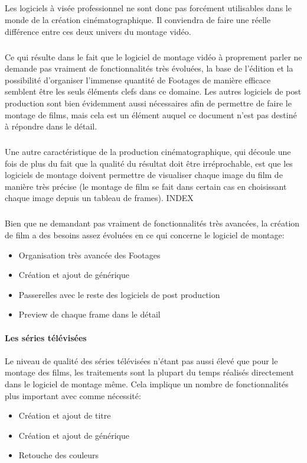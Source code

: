 \subparagraph{}
Les logiciels à visée professionnel ne sont donc pas forcément utilisables dans
le monde de la création cinématographique. Il conviendra de faire une réelle
différence entre ces deux univers du montage vidéo.

\subparagraph{}
Ce qui résulte dans le fait que le logiciel de montage vidéo à proprement parler ne
demande pas vraiment de fonctionnalités très évoluées, la base de l'édition
et la possibilité d'organiser l'immense quantité de Footages de manière efficace
semblent être les seuls éléments clefs dans ce domaine. Les autres logiciels de
post production sont bien évidemment aussi nécessaires afin de permettre de faire
le montage de films, mais cela est un élément auquel ce document n'est pas destiné
à répondre dans le détail.

\subparagraph{}
Une autre caractéristique de la production cinématographique, qui découle une
fois de plus du fait que la qualité du résultat doit être irréprochable, est
que les logiciels de montage doivent permettre de visualiser chaque image du
film de manière très précise (le montage de film se fait dans certain cas en
choisissant chaque image depuis un tableau de frames). INDEX


\subparagraph{}
Bien que ne demandant pas vraiment de fonctionnalités très avancées, la création
de film a des besoins assez évoluées en ce qui concerne le logiciel de montage:
\begin{itemize}
  \item{Organisation très avancée des Footages}
  \item{Création et ajout de générique}
  \item{Passerelles avec le reste des logiciels de post production}
  \item{Preview de chaque frame dans le détail}
\end{itemize}


\paragraph {Les séries télévisées}

\paragraph{}
Le niveau de qualité des séries télévisées n'étant pas aussi élevé que pour
le montage des films, les traitements sont la plupart du temps réalisés
directement dans le logiciel de montage même. Cela implique un nombre de
fonctionnalités plus important avec comme nécessité:
\begin{itemize}
  \item{Création et ajout de titre}
  \item{Création et ajout de générique}
  \item{Retouche des couleurs}
\end{itemize}

